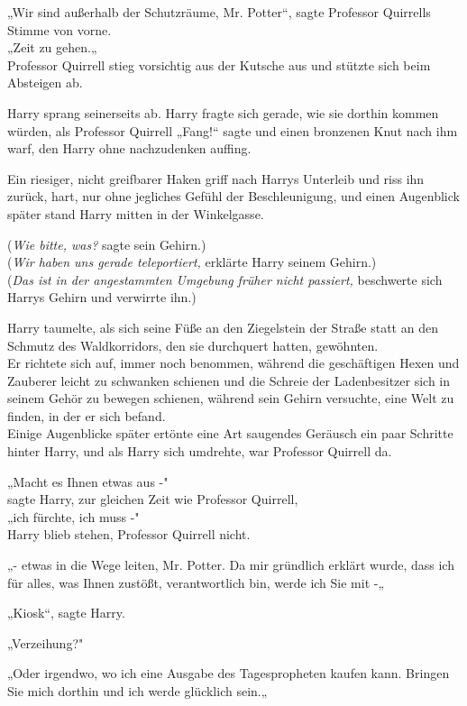 {„Wir sind außerhalb der Schutzräume, Mr. Potter“, sagte Professor Quirrells Stimme von vorne.\\ „Zeit zu gehen.„\\ Professor Quirrell stieg vorsichtig aus der Kutsche aus und stützte sich beim Absteigen ab.

Harry sprang seinerseits ab. Harry fragte sich gerade, wie sie dorthin kommen würden, als Professor Quirrell „Fang!“ sagte und einen bronzenen Knut nach ihm warf, den Harry ohne nachzudenken auffing.

Ein riesiger, nicht greifbarer Haken griff nach Harrys Unterleib und riss ihn zurück, hart, nur ohne jegliches Gefühl der Beschleunigung, und einen Augenblick später stand Harry mitten in der Winkelgasse.

(\emph{Wie bitte, was?} sagte sein Gehirn.)\\ (\emph{Wir haben uns gerade teleportiert,} erklärte Harry seinem Gehirn.)\\ (\emph{Das ist in der angestammten Umgebung früher nicht passiert,} beschwerte sich Harrys Gehirn und verwirrte ihn.)

Harry taumelte, als sich seine Füße an den Ziegelstein der Straße statt an den Schmutz des Waldkorridors, den sie durchquert hatten, gewöhnten.\\ Er richtete sich auf, immer noch benommen, während die geschäftigen Hexen und Zauberer leicht zu schwanken schienen und die Schreie der Ladenbesitzer sich in seinem Gehör zu bewegen schienen, während sein Gehirn versuchte, eine Welt zu finden, in der er sich befand.\\ Einige Augenblicke später ertönte eine Art saugendes Geräusch ein paar Schritte hinter Harry, und als Harry sich umdrehte, war Professor Quirrell da.

„Macht es Ihnen etwas aus -"\\ sagte Harry, zur gleichen Zeit wie Professor Quirrell,\\ „ich fürchte, ich muss -"\\ Harry blieb stehen, Professor Quirrell nicht.

„- etwas in die Wege leiten, Mr. Potter. Da mir gründlich erklärt wurde, dass ich für alles, was Ihnen zustößt, verantwortlich bin, werde ich Sie mit -„

„Kiosk“, sagte Harry.

„Verzeihung?"

„Oder irgendwo, wo ich eine Ausgabe des Tagespropheten kaufen kann. Bringen Sie mich dorthin und ich werde glücklich sein.„

}
